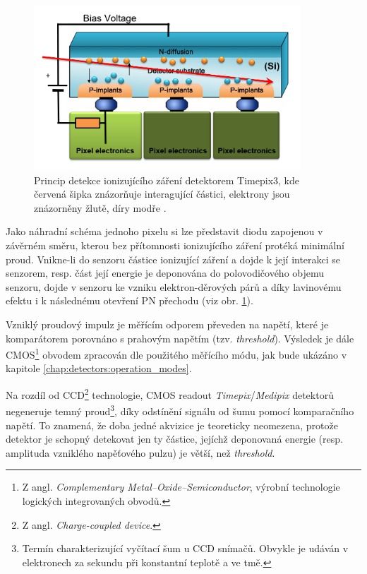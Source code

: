 \begin{figure}[th]
	\begin{center}
		\includegraphics[width=10cm]{figures/det_recombination.png}
		\caption{Princip detekce ionizujícího záření detektorem Timepix3, kde červená šipka znázorňuje interagující částici, elektrony jsou znázorněny žlutě, díry modře \cite{PlatkevicDisertace}.}
		\label{fig:det:recombination}
	\end{center}
\end{figure}

Jako náhradní schéma jednoho pixelu si lze představit diodu zapojenou v závěrném směru, kterou bez přítomnosti ionizujícího záření protéká minimální proud. Vnikne-li do senzoru částice ionizující záření a dojde k její interakci se senzorem, resp. část její energie je deponována do polovodičového objemu senzoru, dojde v senzoru ke vzniku elektron-děrových párů a díky lavinovému efektu i k následnému otevření PN přechodu (viz obr. \ref{fig:det:recombination}).

Vzniklý proudový impulz je měřícím odporem převeden na napětí, které je komparátorem porovnáno s prahovým napětím (tzv. \textit{threshold}). Výsledek je dále CMOS\footnote{Z angl. \textit{Complementary Metal–Oxide–Semiconductor}, výrobní technologie logických integrovaných obvodů.} obvodem zpracován dle použitého měřícího módu, jak bude ukázáno v kapitole \ref{chap:detectors:operation_modes}.

Na rozdíl od CCD\footnote{Z angl. \textit{Charge-coupled device}.} technologie, CMOS readout \textit{Timepix}/\textit{Medipix} detektorů negeneruje temný proud\footnote{Termín charakterizující vyčítací šum u CCD snímačů. Obvykle je udáván v elektronech za sekundu při konstantní teplotě a ve tmě.}, díky odstínění signálu od šumu pomocí komparačního napětí. To znamená, že doba jedné akvizice je teoreticky neomezena, protože detektor je schopný detekovat jen ty částice, jejíchž deponovaná energie (resp. amplituda vzniklého napěťového pulzu) je větší, než \textit{threshold}.

